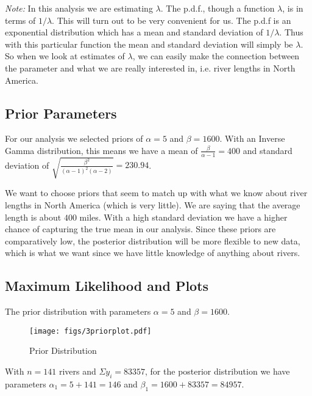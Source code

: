 \documentclass[12pt]{article}
\begin{document}
\begin{scriptsize}
\noindent \textit{Note:} In this analysis we are estimating $\lambda$.  The p.d.f., though a function $\lambda$, is in terms of $1/\lambda$.  This will turn out to be very convenient for us.  The p.d.f is an exponential distribution which has a mean and standard deviation of $1/\lambda$.  Thus with this particular function the mean and standard deviation will simply be $\lambda$.  So when we look at estimates of $\lambda$, we can easily make the connection between the parameter and what we are really interested in, i.e. river lengths in North America.
\end{scriptsize}

\subsection{Prior Parameters}

\noindent For our analysis we selected priors of $\alpha=5$ and $\beta=1600$.  With an Inverse Gamma distribution, this means we have a mean of $\frac{\beta}{\alpha-1}=400$ and standard deviation of $\sqrt{\frac{\beta^2}{(\alpha-1)^2(\alpha-2)}}=230.94$.
\bigskip

\noindent We want to choose priors that seem to match up with what we know about river lengths in North America (which is very little).  We are saying that the average length is about $400$ miles.  With a high standard deviation we have a higher chance of capturing the true mean in our analysis.  Since these priors are comparatively low, the posterior distribution will be more flexible to new data, which is what we want since we have little knowledge of anything about rivers.

\subsection{Maximum Likelihood and Plots}

The prior distribution with parameters $\alpha=5$ and $\beta=1600$.

\begin{figure}[H]
\begin{center}
\texttt{[image: figs/3priorplot.pdf]}
\caption{Prior Distribution}
\end{center}
\end{figure}

\noindent With $n=141$ rivers and $\Sigma y_i=83357$, for the posterior distribution we have parameters $\alpha_1=5+141=146$ and $\beta_1=1600+83357=84957$.
\end{document}
